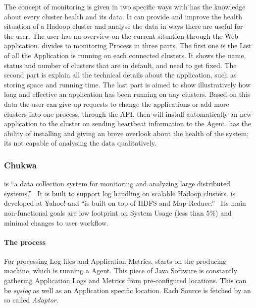 The concept of monitoring is given in two specific ways with \amb\. \amb has the knowledge about every cluster health and its data.\cite{Foley2012} It can provide and improve the health situation of a Hadoop cluster and analyse the data in ways there are useful for the user.\cite{Foley2012} The user has an overview on the current situation through the Web application.\cite{Foley2012} \amb divides to monitoring Process in three parts. \cite{Foley2012}The first one is the List of all the Application \amb is running on each connected clusters. It shows the name, status and number of clusters that are in default, and need to get fixed.\cite{Foley2012} The second part is explain all the technical details about the application, such as storing space and running time.\cite{Foley2012} The last part is aimed to show illustratively how long and effective an application has been running on any clusters. \cite{Foley2012}Based on this data the user can give up requests to change the applications or add more clusters into one process, through the API. \cite{Sako}\amb then will install automatically an new application to the cluster on sending heartbeat information to the \amb Agent.\cite{Sako} \amb has the ability of installing and giving an breve overlook about the health of the system; its not capable of analysing the data qualitatively.\cite{Sako}

\subsubsection{Chukwa}
\chuklong is ``a data collection system for monitoring and analyzing large distributed systems.''~\cite{Boulona}
It is built to support log handling on scalable Hadoop clusters. \chuk is developed at Yahoo! and ``is built on top of HDFS and Map-Reduce.''~\cite{Rabkin2008a}
Its main non-functional goals are low footprint on System Usage (less than 5\%) and minimal changes to user workflow.~\cite{Rabkin2010}

\paragraph{The process}
For processing Log files and Application Metrics, \chuk starts on the producing machine, which is running a \chuk Agent. 
This piece of Java Software is constantly gathering Application Logs and Metrics from pre-configured locations. 
This can be \textit{syslog} as well as an Application specific location. 
Each Source is fetched by an so called \textit{Adaptor}.~\cite{ChukwaAdminAgent}

